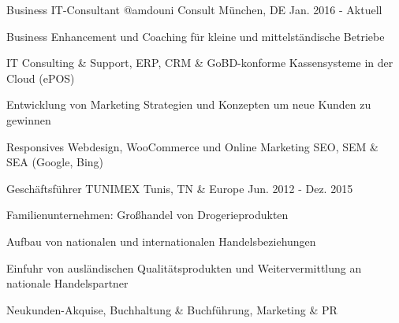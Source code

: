 


\begin{cventries}


\cventry
{Business IT-Consultant} %
{@amdouni Consult} %
{M\"unchen, DE} %
{Jan. 2016 - Aktuell} %
{ %
\begin{cvitems}
\item {Business Enhancement und Coaching f\"ur kleine und mittelst\"andische Betriebe}
\item {IT Consulting \& Support, ERP, CRM \& GoBD-konforme Kassensysteme in der Cloud (ePOS)}
\item {Entwicklung von Marketing Strategien und Konzepten um neue Kunden zu gewinnen}
\item {Responsives Webdesign, WooCommerce und Online Marketing SEO, SEM \& SEA (Google,
Bing)}
\end{cvitems}
}


\cventry
{Gesch\"aftsf\"uhrer} %
{TUN{\cdotp}IM{\cdotp}EX} %
{Tunis, TN \& Europe} %
{Jun. 2012 - Dez. 2015} %
{ %
\begin{cvitems}
\item {Familienunternehmen: Gro\ss{}handel von Drogerieprodukten}
\item {Aufbau von nationalen und internationalen Handelsbeziehungen}
\item {Einfuhr von ausl\"andischen Qualit\"atsprodukten und Weitervermittlung an nationale Handelspartner}
\item {Neukunden-Akquise, Buchhaltung \& Buchf\"uhrung, Marketing \& PR}
\end{cvitems}
}



\end{cventries}
